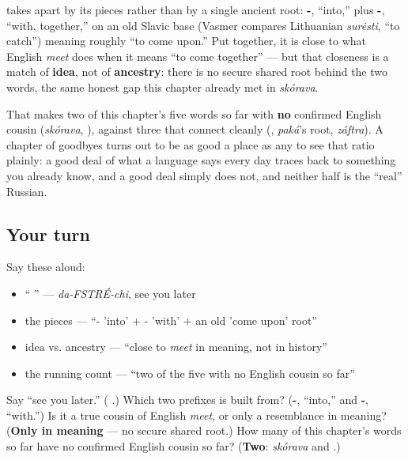 \begin{cousinweb}
\textbf{} takes apart by its pieces rather than by a single ancient root: \textbf{-}, \textquotedblleft{}into,\textquotedblright{} plus \textbf{-}, \textquotedblleft{}with, together,\textquotedblright{} on an old Slavic base (Vasmer compares Lithuanian \emph{surėsti}, \textquotedblleft{}to catch\textquotedblright{}) meaning roughly \textquotedblleft{}to come upon.\textquotedblright{} Put together, it is close to what English \emph{meet} does when it means \textquotedblleft{}to come together\textquotedblright{} — but that closeness is a match of \textbf{idea}, not of \textbf{ancestry}: there is no secure shared root behind the two words, the same honest gap this chapter already met in \emph{skórava}.

That makes two of this chapter's five words so far with \textbf{no} confirmed English cousin (\emph{skórava}, \emph{}), against three that connect cleanly (\emph{}, \emph{paká}'s root, \emph{záftra}). A chapter of goodbyes turns out to be as good a place as any to see that ratio plainly: a good deal of what a language says every day traces back to something you already know, and a good deal simply does not, and neither half is the \textquotedblleft{}real\textquotedblright{} Russian.
\end{cousinweb}

\subsection*{Your turn}
Say these aloud:

\begin{itemize}
\raggedright
  \item \textquotedblleft{} \textquotedblright{} — \emph{da-FSTRÉ-chi}, see you later
  \item the pieces — \textquotedblleft{}- 'into' + - 'with' + an old 'come upon' root\textquotedblright{}
  \item idea vs. ancestry — \textquotedblleft{}close to \emph{meet} in meaning, not in history\textquotedblright{}
  \item the running count — \textquotedblleft{}two of the five with no English cousin so far\textquotedblright{}
\end{itemize}

\begin{tcolorbox}[breakable,colback=teal!4,colframe=teal!35!black,title={Before you move on}]
Say \textquotedblleft{}see you later.\textquotedblright{} (\textbf{ }.) Which two prefixes is \emph{} built from? (\textbf{-}, \textquotedblleft{}into,\textquotedblright{} and \textbf{-}, \textquotedblleft{}with.\textquotedblright{}) Is it a true cousin of English \emph{meet}, or only a resemblance in meaning? (\textbf{Only in meaning} — no secure shared root.) How many of this chapter's words so far have no confirmed English cousin so far? (\textbf{Two}: \emph{skórava} and \emph{}.)
\end{tcolorbox}

